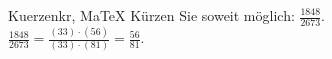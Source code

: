 \begin{MAufgabe}{Kuerzen}{kr, MaTeX}
K\"urzen Sie soweit m\"oglich: $\frac{1848}{2673}$.\\ 
\ifLsg\MLoesung
\quad $\frac{1848}{2673}=\frac{(33)\cdot(56)}{(33)\cdot(81)}=\frac{56}{81}$.\else\relax\fi
 \end{MAufgabe}